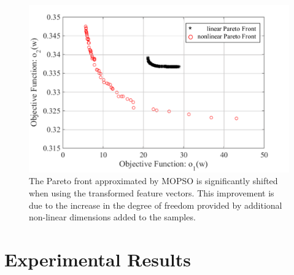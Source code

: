 \begin{figure}[t]
\centering
\includegraphics[scale=.6]{Fig/pareto_compare.pdf}
\caption{The Pareto front approximated by MOPSO is significantly shifted when using the transformed feature vectors. This improvement is due to the increase in the degree of freedom provided by additional non-linear dimensions added to the samples.}
\label{fig:pareto_compare}
\end{figure}

\section{Experimental Results}\label{sec:result1}

